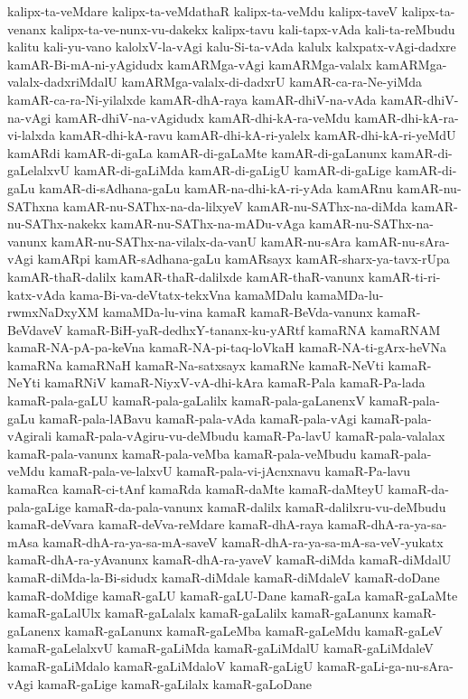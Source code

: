 {kalipx-ta-veMdare
kalipx-ta-veMdathaR
kalipx-ta-veMdu
kalipx-taveV
kalipx-ta-venanx
kalipx-ta-ve-nunx-vu-dakekx
kalipx-tavu
kali-tapx-vAda
kali-ta-reMbudu
kalitu
kali-yu-vano
kalolxV-la-vAgi
kalu-Si-ta-vAda
kalulx
kalxpatx-vAgi-dadxre
kamAR-Bi-mA-ni-yAgidudx
kamARMga-vAgi
kamARMga-valalx
kamARMga-valalx-dadxriMdalU
kamARMga-valalx-di-dadxrU
kamAR-ca-ra-Ne-yiMda
kamAR-ca-ra-Ni-yilalxde
kamAR-dhA-raya
kamAR-dhiV-na-vAda
kamAR-dhiV-na-vAgi
kamAR-dhiV-na-vAgidudx
kamAR-dhi-kA-ra-veMdu
kamAR-dhi-kA-ra-vi-lalxda
kamAR-dhi-kA-ravu
kamAR-dhi-kA-ri-yalelx
kamAR-dhi-kA-ri-yeMdU
kamARdi
kamAR-di-gaLa
kamAR-di-gaLaMte
kamAR-di-gaLanunx
kamAR-di-gaLelalxvU
kamAR-di-gaLiMda
kamAR-di-gaLigU
kamAR-di-gaLige
kamAR-di-gaLu
kamAR-di-sAdhana-gaLu
kamAR-na-dhi-kA-ri-yAda
kamARnu
kamAR-nu-SAThxna
kamAR-nu-SAThx-na-da-lilxyeV
kamAR-nu-SAThx-na-diMda
kamAR-nu-SAThx-nakekx
kamAR-nu-SAThx-na-mADu-vAga
kamAR-nu-SAThx-na-vanunx
kamAR-nu-SAThx-na-vilalx-da-vanU
kamAR-nu-sAra
kamAR-nu-sAra-vAgi
kamARpi
kamAR-sAdhana-gaLu
kamARsayx
kamAR-sharx-ya-tavx-rUpa
kamAR-thaR-dalilx
kamAR-thaR-dalilxde
kamAR-thaR-vanunx
kamAR-ti-ri-katx-vAda
kama-Bi-va-deVtatx-tekxVna
kamaMDalu
kamaMDa-lu-rwmxNaDxyXM
kamaMDa-lu-vina
kamaR
kamaR-BeVda-vanunx
kamaR-BeVdaveV
kamaR-BiH-yaR-dedhxY-tananx-ku-yARtf
kamaRNA
kamaRNAM
kamaR-NA-pA-pa-keVna
kamaR-NA-pi-taq-loVkaH
kamaR-NA-ti-gArx-heVNa
kamaRNa
kamaRNaH
kamaR-Na-satxsayx
kamaRNe
kamaR-NeVti
kamaR-NeYti
kamaRNiV
kamaR-NiyxV-vA-dhi-kAra
kamaR-Pala
kamaR-Pa-lada
kamaR-pala-gaLU
kamaR-pala-gaLalilx
kamaR-pala-gaLanenxV
kamaR-pala-gaLu
kamaR-pala-lABavu
kamaR-pala-vAda
kamaR-pala-vAgi
kamaR-pala-vAgirali
kamaR-pala-vAgiru-vu-deMbudu
kamaR-Pa-lavU
kamaR-pala-valalax
kamaR-pala-vanunx
kamaR-pala-veMba
kamaR-pala-veMbudu
kamaR-pala-veMdu
kamaR-pala-ve-lalxvU
kamaR-pala-vi-jAcnxnavu
kamaR-Pa-lavu
kamaRca
kamaR-ci-tAnf
kamaRda
kamaR-daMte
kamaR-daMteyU
kamaR-da-pala-gaLige
kamaR-da-pala-vanunx
kamaR-dalilx
kamaR-dalilxru-vu-deMbudu
kamaR-deVvara
kamaR-deVva-reMdare
kamaR-dhA-raya
kamaR-dhA-ra-ya-sa-mAsa
kamaR-dhA-ra-ya-sa-mA-saveV
kamaR-dhA-ra-ya-sa-mA-sa-veV-yukatx
kamaR-dhA-ra-yAvanunx
kamaR-dhA-ra-yaveV
kamaR-diMda
kamaR-diMdalU
kamaR-diMda-la-Bi-sidudx
kamaR-diMdale
kamaR-diMdaleV
kamaR-doDane
kamaR-doMdige
kamaR-gaLU
kamaR-gaLU-Dane
kamaR-gaLa
kamaR-gaLaMte
kamaR-gaLalUlx
kamaR-gaLalalx
kamaR-gaLalilx
kamaR-gaLanunx
kamaR-gaLanenx
kamaR-gaLanunx
kamaR-gaLeMba
kamaR-gaLeMdu
kamaR-gaLeV
kamaR-gaLelalxvU
kamaR-gaLiMda
kamaR-gaLiMdalU
kamaR-gaLiMdaleV
kamaR-gaLiMdalo
kamaR-gaLiMdaloV
kamaR-gaLigU
kamaR-gaLi-ga-nu-sAra-vAgi
kamaR-gaLige
kamaR-gaLilalx
kamaR-gaLoDane
}
